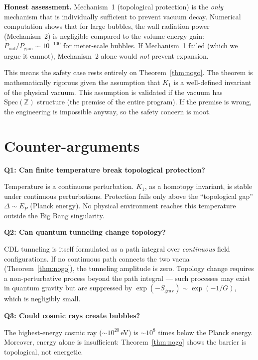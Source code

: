 \documentclass[11pt,a4paper]{article}
\newcommand{\Spec}{\mathrm{Spec}}
\begin{document}
\textbf{Honest assessment.}
Mechanism~1 (topological protection) is the \emph{only} mechanism
that is individually sufficient to prevent vacuum decay.
Numerical computation shows that for large bubbles, the wall
radiation power (Mechanism~2) is negligible compared to the
volume energy gain: $P_{\mathrm{rad}} / P_{\mathrm{gain}} \sim 10^{-100}$
for meter-scale bubbles. If Mechanism~1 failed (which we argue
it cannot), Mechanism~2 alone would \emph{not} prevent expansion.

This means the safety case rests entirely on
Theorem~\ref{thm:nogo}. The theorem is mathematically rigorous
given the assumption that $K_1$ is a well-defined invariant of the
physical vacuum. This assumption is validated if the vacuum
has $\Spec(\mathbb{Z})$ structure (the premise of the entire
program). If the premise is wrong, the engineering is impossible
anyway, so the safety concern is moot.

\section{Counter-arguments}

\textbf{Q1: Can finite temperature break topological protection?}

Temperature is a continuous perturbation. $K_1$, as a homotopy
invariant, is stable under continuous perturbations. Protection
fails only above the ``topological gap'' $\Delta \sim E_P$
(Planck energy). No physical environment reaches this
temperature outside the Big Bang singularity.

\textbf{Q2: Can quantum tunneling change topology?}

CDL tunneling is itself formulated as a path integral over
\emph{continuous} field configurations. If no continuous path
connects the two vacua (Theorem~\ref{thm:nogo}), the tunneling
amplitude is zero. Topology change requires a non-perturbative
process beyond the path integral --- such processes may exist
in quantum gravity but are suppressed by
$\exp(-S_{\mathrm{grav}}) \sim \exp(-1/G)$, which is negligibly
small.

\textbf{Q3: Could cosmic rays create bubbles?}

The highest-energy cosmic ray ($\sim 10^{20}$\,eV) is
$\sim 10^8$ times below the Planck energy. Moreover, energy alone
is insufficient: Theorem~\ref{thm:nogo} shows the barrier is
topological, not energetic.
\end{document}
